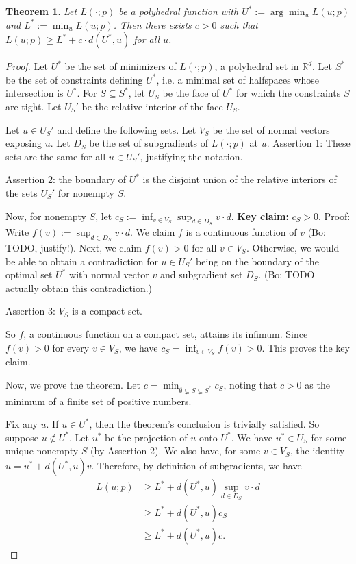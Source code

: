 \documentclass{article}
\newcommand{\reals}{\mathbb{R}}
\newtheorem{theorem}{Theorem}
\theoremstyle{definition}
\begin{document}
\begin{theorem}
  Let $L(\cdot;p)$ be a polyhedral function with $U^* := \arg\min_{u} L(u;p)$ and $L^* := \min_u L(u;p)$.
  Then there exists $c > 0$ such that $L(u;p) \geq L^* + c \cdot d(U^*,u)$ for all $u$.
\end{theorem}
\begin{proof}
  Let $U^*$ be the set of minimizers of $L(\cdot;p)$, a polyhedral set in $\reals^d$.
  Let $S^*$ be the set of constraints defining $U^*$, i.e. a minimal set of halfspaces whose intersection is $U^*$.
  For $S \subseteq S^*$, let $U_S$ be the face of $U^*$ for which the constraints $S$ are tight.
  Let $U_S'$ be the relative interior of the face $U_S$.

  Let $u \in U_S'$ and define the following sets.
  Let $V_S$ be the set of normal vectors exposing $u$.
  Let $D_S$ be the set of subgradients of $L(\cdot;p)$ at $u$.
  Assertion 1: These sets are the same for all $u \in U_S'$, justifying the notation.

  Assertion 2: the boundary of $U^*$ is the disjoint union of the relative interiors of the sets $U_S'$ for nonempty $S$.

  Now, for nonempty $S$, let $c_S := \inf_{v \in V_S} \sup_{d \in D_S} v \cdot d$.
  \textbf{Key claim:} $c_S > 0$.
  Proof: Write $f(v) := \sup_{d \in D_S} v \cdot d$.
  We claim $f$ is a continuous function of $v$ (Bo: TODO, justify!).
  Next, we claim $f(v) > 0$ for all $v \in V_S$.
  Otherwise, we would be able to obtain a contradiction for $u \in U_S'$ being on the boundary of the optimal set $U^*$ with normal vector $v$ and subgradient set $D_S$. (Bo: TODO actually obtain this contradiction.)

  Assertion 3: $V_S$ is a compact set.

  So $f$, a continuous function on a compact set, attains its infimum.
  Since $f(v) > 0$ for every $v \in V_S$, we have $c_S = \inf_{v \in V_S} f(v) > 0$.
  This proves the key claim.

  Now, we prove the theorem.
  Let $c = \min_{\emptyset \subsetneq S \subsetneq S^*} c_S$, noting that $c > 0$ as the minimum of a finite set of positive numbers.

  Fix any $u$.
  If $u \in U^*$, then the theorem's conclusion is trivially satisfied.
  So suppose $u \not\in U^*$.
  Let $u^*$ be the projection of $u$ onto $U^*$.
  We have $u^* \in U_S$ for some unique nonempty $S$ (by Assertion 2).
  We also have, for some $v \in V_S$, the identity $u = u^* + d(U^*,u) v$.
  Therefore, by definition of subgradients, we have
  \begin{align*}
    L(u;p) &\geq L^* + d(U^*,u) \sup_{d \in D_S} v \cdot d  \\
           &\geq L^* + d(U^*,u) c_S  \\
           &\geq L^* + d(U^*,u) c .
  \end{align*}
\end{proof}
\end{document}
